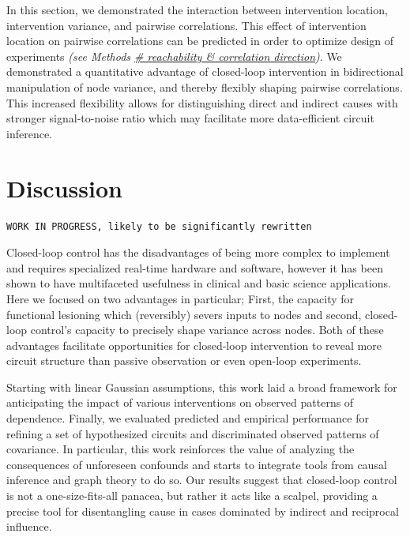\documentclass{article}
\begin{document}
In this section, we demonstrated the interaction between intervention location, intervention variance, and pairwise correlations. This effect of intervention location on pairwise correlations can be predicted in order to optimize design of experiments \emph{(see Methods
\href{/section_content/methods_coreach_sign.md}{\# reachability \&
correlation direction})}. We demonstrated a quantitative advantage of closed-loop intervention in bidirectional manipulation of node variance, and thereby flexibly shaping pairwise correlations. This increased flexibility allows for distinguishing direct and indirect causes with stronger signal-to-noise ratio which may facilitate more data-efficient circuit inference.

\hypertarget{discussion}{%
\section{Discussion}\label{discussion}}

\texttt{WORK\ IN\ PROGRESS,\ likely\ to\ be\ significantly\ rewritten}

Closed-loop control has the disadvantages of being more complex to implement and requires specialized real-time hardware and software, however it has been shown to have multifaceted usefulness in clinical and basic science applications. Here we focused on two advantages in particular; First, the capacity for functional lesioning which
(reversibly) severs inputs to nodes and second, closed-loop control's capacity to precisely shape variance across nodes. Both of these advantages facilitate opportunities for closed-loop intervention to reveal more circuit structure than passive observation or even open-loop experiments.

Starting with linear Gaussian assumptions, this work laid a broad framework for anticipating the impact of various interventions on observed patterns of dependence. Finally, we evaluated predicted and empirical performance for refining a set of hypothesized circuits and discriminated observed patterns of covariance. In particular, this work reinforces the value of analyzing the consequences of unforeseen confounds and starts to integrate tools from causal inference and graph theory to do so. Our results suggest that closed-loop control is not a one-size-fits-all panacea, but rather it acts like a scalpel, providing a precise tool for disentangling cause in cases dominated by indirect and reciprocal influence.
\end{document}
